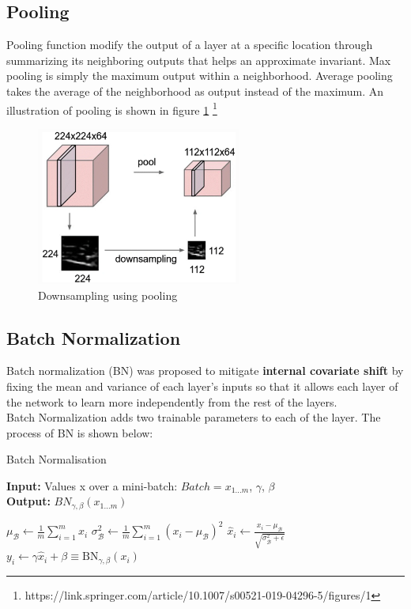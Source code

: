 \subsection{Pooling}
Pooling function modify the output of a layer at a specific location through summarizing its neighboring outputs that helps an approximate invariant. Max pooling is simply the maximum output within a neighborhood. Average pooling takes the average of the neighborhood as output instead of the maximum. An illustration of pooling is shown in figure \ref{fig:pooling}
\footnote{https://link.springer.com/article/10.1007/s00521-019-04296-5/figures/1}
\begin{figure}[h]
	\centering
	\includegraphics[width=0.6\textwidth]{img/background_img/pooling_img}
	\caption{Downsampling using pooling}
	\label{fig:pooling}
\end{figure}

\subsection{Batch Normalization}
Batch normalization (BN) was proposed to mitigate \textbf{internal covariate shift} by fixing the mean and variance of each layer's inputs so that it allows each layer of the network to learn more independently from the rest of the layers.\\

Batch Normalization adds two trainable parameters to each of the layer. The process of BN is shown below:
\begin{algorithm}
    \caption{Batch Normalisation}\label{BatchNorm}
    \hspace*{\algorithmicindent} \textbf{Input:} Values x over a mini-batch: $Batch = {x_{1...m}}$, $\gamma$, $\beta$\\
    \hspace*{\algorithmicindent} \textbf{Output:} $BN_{\gamma,\beta}(x_{1...m})$
    \begin{algorithmic}[]
    \State $\mu_{\mathcal{B}} \gets \frac{1}{m} \sum_{i=1}^{m} x_{i}$    
    \State $\sigma_{\mathcal{B}}^{2} \leftarrow \frac{1}{m} \sum_{i=1}^{m}\left(x_{i}-\mu_{\mathcal{B}}\right)^{2}$
    \State {}
    \State $\widehat{x}_{i} \leftarrow \frac{x_{i}-\mu_{\mathcal{B}}}{\sqrt{\sigma_{\mathcal{B}}^{2}+\epsilon}}$  
    \State {}
    \State $y_{i} \leftarrow \gamma \widehat{x}_{i}+\beta \equiv \mathrm{B} \mathrm{N}_{\gamma, \beta}\left(x_{i}\right)$
    \end{algorithmic}
    \end{algorithm}

